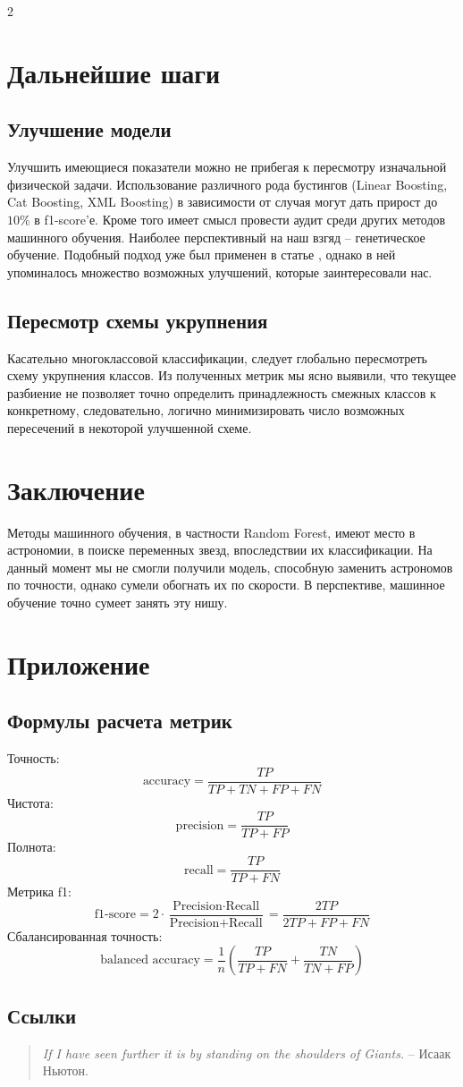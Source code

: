 \documentclass[11pt, a4paper]{article}
\begin{document}
\begin{multicols}{2}
    \section{Дальнейшие шаги}
    \subsection{Улучшение модели}
    Улучшить имеющиеся показатели можно не прибегая к пересмотру изначальной физической задачи. Использование различного рода бустингов (Linear Boosting, Cat Boosting, XML Boosting) в зависимости от случая могут дать прирост до $10\%$ в f1-score'е. Кроме того имеет смысл провести аудит среди других методов машинного обучения. Наиболее перспективный на наш взгяд -- генетическое обучение. Подобный подход уже был применен в статье \autocite{Bloom2011}, однако в ней упоминалось множество возможных улучшений, которые заинтересовали нас.
    
    \subsection{Пересмотр схемы укрупнения}
    Касательно многоклассовой классификации, следует глобально пересмотреть схему укрупнения классов. Из полученных метрик мы ясно выявили, что текущее разбиение не позволяет точно определить принадлежность смежных классов к конкретному, следовательно, логично минимизировать число возможных пересечений в некоторой улучшенной схеме.

    \section{Заключение}
    Методы машинного обучения,  в частности Random Forest, имеют место в астрономии, в поиске переменных звезд, впоследствии их классификации. На данный момент мы не смогли получили модель, способную заменить астрономов по точности, однако сумели обогнать их по скорости. В перспективе, машинное обучение точно сумеет занять эту нишу. 

    \section{Приложение}
    \subsection{Формулы расчета метрик}
    Точность:
    $$\text{accuracy}=\frac{TP}{TP+TN+FP+FN}$$
    Чистота:
    $$\text{precision}=\frac{TP}{TP+FP}$$
    Полнота:
    $$\text{recall} =\frac{TP}{TP+FN}$$
    Метрика f1:
    $$\text{f1-score} =2\cdot\frac{\text{Precision}\cdot \text{Recall}}{\text{Precision}  + \text{Recall}}=\frac{2TP}{2TP+FP+FN}$$
    Сбалансированная точность:
    $$\text{balanced accuracy}=\frac{1}{n}\left(\frac{TP}{TP+FN}+\frac{TN}{TN+FP}\right)$$
    \subsection{Ссылки}
    \printbibliography
\end{multicols}

\begin{minipage}{0.7\textwidth}
\begin{quote}
    \textit{If I have seen further it is by standing on the shoulders of Giants.} -- Исаак Ньютон.
\end{quote}
\end{minipage}
\end{document}
